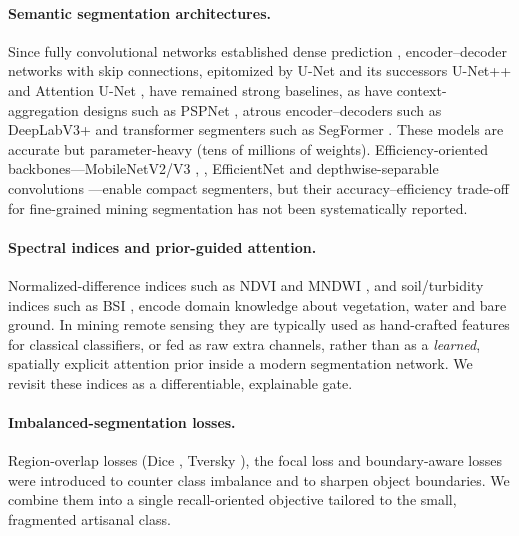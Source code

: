 \documentclass[review]{elsarticle}
\begin{document}
\paragraph{Semantic segmentation architectures.}
Since fully convolutional networks established dense prediction \citep{long2015fcn},
encoder--decoder networks with skip connections, epitomized by U-Net
\citep{ronneberger2015unet} and its successors U-Net++ \citep{zhou2019unetpp} and
Attention U-Net \citep{oktay2018attentionunet}, have remained strong baselines, as have
context-aggregation designs such as PSPNet \citep{zhao2017pspnet}, atrous
encoder--decoders such as DeepLabV3+ \citep{chen2018deeplabv3plus} and transformer
segmenters such as SegFormer \citep{xie2021segformer}. These models are accurate but
parameter-heavy (tens of millions of weights). Efficiency-oriented backbones---MobileNetV2/V3
\citep{sandler2018mobilenetv2}, \citep{howard2019mobilenetv3}, EfficientNet
\citep{tan2019efficientnet} and depthwise-separable convolutions
\citep{chollet2017xception}---enable compact segmenters, but their accuracy--efficiency
trade-off for fine-grained mining segmentation has not been systematically reported.

\paragraph{Spectral indices and prior-guided attention.}
Normalized-difference indices such as NDVI \citep{rouse1974ndvi} and MNDWI
\citep{xu2006mndwi}, and soil/turbidity indices such as BSI \citep{rikimaru2002bsi}, encode
domain knowledge about vegetation, water and bare ground. In mining remote sensing they are
typically used as hand-crafted features for classical classifiers, or fed as raw extra
channels, rather than as a \emph{learned}, spatially explicit attention prior inside a
modern segmentation network. We revisit these indices as a differentiable, explainable gate.

\paragraph{Imbalanced-segmentation losses.}
Region-overlap losses (Dice \citep{milletari2016vnet}, Tversky
\citep{salehi2017tversky}), the focal loss \citep{lin2020focal} and boundary-aware losses
\citep{kervadec2021boundary} were introduced to counter class imbalance and to sharpen
object boundaries. We combine them into a single recall-oriented objective tailored to the
small, fragmented artisanal class.
\end{document}
